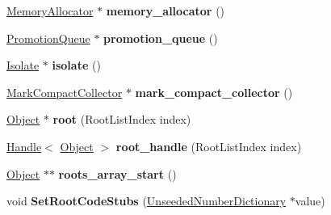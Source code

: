 \begin{DoxyCompactItemize}
\item 
\hyperlink{classv8_1_1internal_1_1_memory_allocator}{Memory\+Allocator} $\ast$ {\bfseries memory\+\_\+allocator} ()\hypertarget{classv8_1_1internal_1_1_heap_a9564c4573a66c20043a7602155074b57}{}\label{classv8_1_1internal_1_1_heap_a9564c4573a66c20043a7602155074b57}

\item 
\hyperlink{classv8_1_1internal_1_1_promotion_queue}{Promotion\+Queue} $\ast$ {\bfseries promotion\+\_\+queue} ()\hypertarget{classv8_1_1internal_1_1_heap_a5542984f4d7809b2622685bad7138d1a}{}\label{classv8_1_1internal_1_1_heap_a5542984f4d7809b2622685bad7138d1a}

\item 
\hyperlink{classv8_1_1internal_1_1_isolate}{Isolate} $\ast$ {\bfseries isolate} ()\hypertarget{classv8_1_1internal_1_1_heap_a7af0a9e8ba9409e89a980ec37a3a9f3d}{}\label{classv8_1_1internal_1_1_heap_a7af0a9e8ba9409e89a980ec37a3a9f3d}

\item 
\hyperlink{classv8_1_1internal_1_1_mark_compact_collector}{Mark\+Compact\+Collector} $\ast$ {\bfseries mark\+\_\+compact\+\_\+collector} ()\hypertarget{classv8_1_1internal_1_1_heap_af562806aafc1f078a8da45674d431c1a}{}\label{classv8_1_1internal_1_1_heap_af562806aafc1f078a8da45674d431c1a}

\item 
\hyperlink{classv8_1_1internal_1_1_object}{Object} $\ast$ {\bfseries root} (Root\+List\+Index index)\hypertarget{classv8_1_1internal_1_1_heap_a3db9089ab8c536b000b38c0e28d4bf1e}{}\label{classv8_1_1internal_1_1_heap_a3db9089ab8c536b000b38c0e28d4bf1e}

\item 
\hyperlink{classv8_1_1internal_1_1_handle}{Handle}$<$ \hyperlink{classv8_1_1internal_1_1_object}{Object} $>$ {\bfseries root\+\_\+handle} (Root\+List\+Index index)\hypertarget{classv8_1_1internal_1_1_heap_ad656a1941f0405bab2e018f54fda5ba9}{}\label{classv8_1_1internal_1_1_heap_ad656a1941f0405bab2e018f54fda5ba9}

\item 
\hyperlink{classv8_1_1internal_1_1_object}{Object} $\ast$$\ast$ {\bfseries roots\+\_\+array\+\_\+start} ()\hypertarget{classv8_1_1internal_1_1_heap_a72711cd12c0d359ed1f17cd63435b7a5}{}\label{classv8_1_1internal_1_1_heap_a72711cd12c0d359ed1f17cd63435b7a5}

\item 
void {\bfseries Set\+Root\+Code\+Stubs} (\hyperlink{classv8_1_1internal_1_1_unseeded_number_dictionary}{Unseeded\+Number\+Dictionary} $\ast$value)\hypertarget{classv8_1_1internal_1_1_heap_ac6964defae6d66c8d5ffc2c4130de557}{}\label{classv8_1_1internal_1_1_heap_ac6964defae6d66c8d5ffc2c4130de557}


\end{DoxyCompactItemize}
